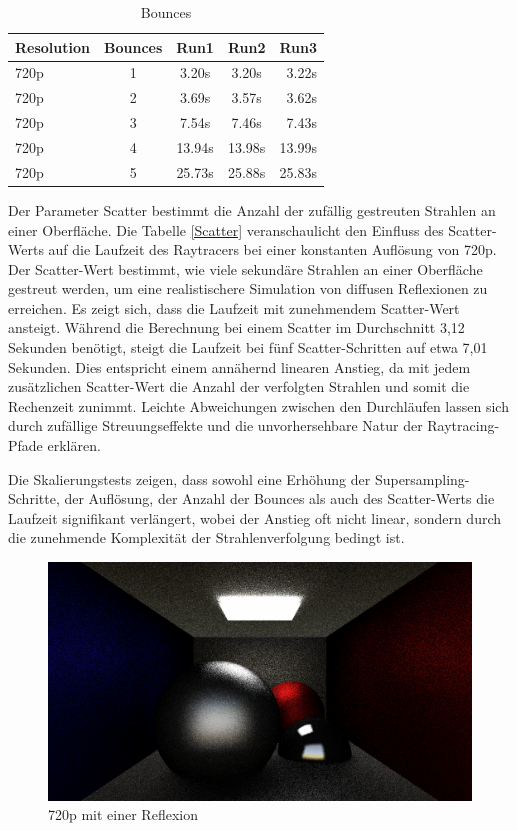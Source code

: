 \documentclass[sigconf]{acmart}
\begin{document}
\begin{table}[t]
 \caption{Bounces}

 \label{Bounces}
 \centering
 \small
 \begin{tabular}[h]{lcccr}
  \toprule
  Resolution & Bounces & Run1 & Run2 & Run3\\
  \midrule
  720p & 1 & 3.20s & 3.20s & 3.22s\\
  720p & 2 & 3.69s & 3.57s & 3.62s\\
  720p & 3 & 7.54s & 7.46s & 7.43s\\
  720p & 4 & 13.94s & 13.98s & 13.99s\\
  720p & 5 & 25.73s & 25.88s & 25.83s\\
  \bottomrule
 \end{tabular}
\end{table}

Der Parameter Scatter bestimmt die Anzahl der zufällig gestreuten Strahlen an einer Oberfläche.
Die Tabelle \ref{Scatter} veranschaulicht den Einfluss des Scatter-Werts auf die Laufzeit des Raytracers bei einer konstanten Auflösung von 720p.
Der Scatter-Wert bestimmt, wie viele sekundäre Strahlen an einer Oberfläche gestreut werden, um eine realistischere Simulation von diffusen Reflexionen zu erreichen.
Es zeigt sich, dass die Laufzeit mit zunehmendem Scatter-Wert ansteigt.
Während die Berechnung bei einem Scatter im Durchschnitt 3,12 Sekunden benötigt, steigt die Laufzeit bei fünf Scatter-Schritten auf etwa 7,01 Sekunden.
Dies entspricht einem annähernd linearen Anstieg, da mit jedem zusätzlichen Scatter-Wert die Anzahl der verfolgten Strahlen und somit die Rechenzeit zunimmt.
Leichte Abweichungen zwischen den Durchläufen lassen sich durch zufällige Streuungseffekte und die unvorhersehbare Natur der Raytracing-Pfade erklären.

Die Skalierungstests zeigen, dass sowohl eine Erhöhung der Supersampling-Schritte, der Auflösung, der Anzahl der Bounces als auch des Scatter-Werts die Laufzeit signifikant verlängert, wobei der Anstieg oft nicht linear, sondern durch die zunehmende Komplexität der Strahlenverfolgung bedingt ist.
\begin{figure}[t]
\centering
\includegraphics[width=0.7\linewidth]{img/bounce1.png}
\caption{720p mit einer Reflexion}
\label{Bounces1}
\end{figure}
\end{document}
